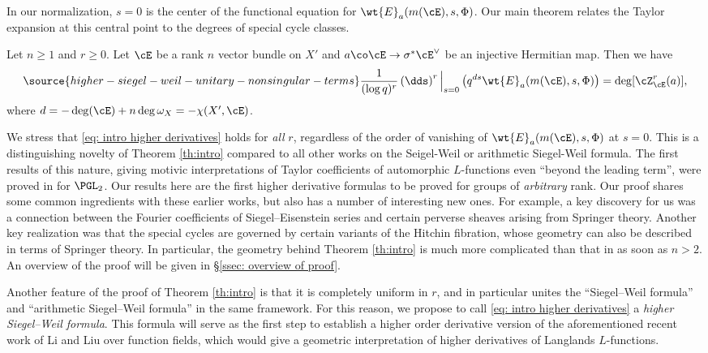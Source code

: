 In our normalization, $s=0$ is the center of the functional equation for $\wt{E}_a(m(\cE), s, \Phi)$. Our main theorem relates the Taylor expansion at this central point to the degrees of special cycle classes.

\begin{thm}
\notready\label{th:intro} Let $n \geq 1$ and $r \geq 0$. Let $\cE$ be a rank $n$ vector bundle on $X'$ and $a \co \cE \rightarrow \sigma^*  \cE^{\vee}$ be an injective Hermitian map. Then we have
\begin{equation}\label{eq: intro higher derivatives}
\source{higher-siegel-weil-unitary-nonsingular-terms}
\frac{1}{(\log q)^r}  \left(\dds \right)^r\Big|_{s=0} \left( q^{ds} \wt{E}_{a}(m(\cE),s,\Phi) \right)  =  \deg [\cZ_{\cE}^r(a)],
\end{equation}
where $d=-\deg(\cE)+n\deg\omega_X =-\chi(X',\cE)$.
\end{thm}



 We stress that \eqref{eq: intro higher derivatives} holds for \emph{all} $r$, regardless of the order of vanishing of $\wt{E}_{a}(m(\cE),s,\Phi)$ at $s=0$. This is a distinguishing novelty of Theorem \ref{th:intro} compared to all other works on the Seigel-Weil or arithmetic Siegel-Weil formula. The first results of this nature, giving motivic interpretations of Taylor coefficients of automorphic $L$-functions even ``beyond the leading term'', were proved in \cite{YZ,YZII} for $\PGL_2$. Our results here are the first higher derivative formulas to be proved for groups of \emph{arbitrary} rank. Our proof shares some common ingredients with these earlier works, but also has a number of interesting new ones. For example, a key discovery for us was a connection between the Fourier coefficients of Siegel--Eisenstein series and certain perverse sheaves arising from Springer theory. Another key realization was that the special cycles are governed by certain variants of the Hitchin fibration, whose geometry can also be described in terms of Springer theory. In particular, the geometry behind Theorem \ref{th:intro} is much more complicated than that in \cite{YZ,YZII} as soon as $n>2$. An overview of the proof will be given in \S \ref{ssec: overview of proof}.

Another feature of the proof of Theorem \ref{th:intro} is that it is completely uniform in $r$, and in particular unites the ``Siegel--Weil formula'' and ``arithmetic Siegel--Weil formula'' in the same framework. For this reason, we propose to call \eqref{eq: intro higher derivatives} a {\em higher Siegel--Weil formula}. This formula will serve as the first step to establish a higher order derivative version of the aforementioned recent work of Li and Liu \cite{LL1,LL2} over function fields, which would give a geometric interpretation of higher derivatives of Langlands $L$-functions.

